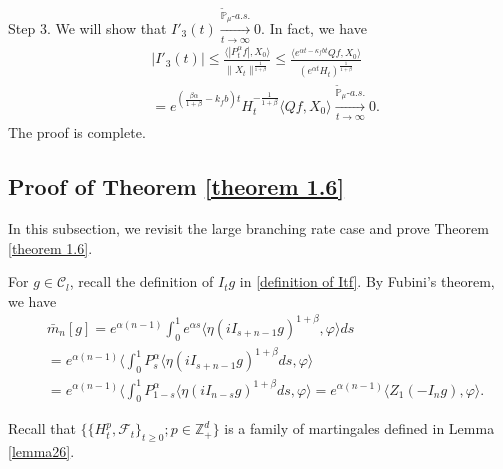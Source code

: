 \documentclass[12pt,a4paper]{amsart}
\theoremstyle{plain}
\theoremstyle{definition}
\numberwithin{equation}{section}
\begin{document}
	Step 3. We will show that $I'_3(t) \xrightarrow[t\to \infty]{\tilde {\mathbb P}_\mu \text{-} a.s.} 0$.
In fact, we have
\begin{equation}\begin{split}
	&|I'_3(t)|
     \leq \frac{\langle |P^\alpha_tf|,X_0\rangle}{\|X_t\|^{\frac{1}{1+\beta}}}
	\leq \frac{\langle e^{\alpha t - \kappa_f b t}Qf,X_0\rangle}{(e^{\alpha t} H_t)^{\frac{1}{1+\beta}}}
	\\& = e^{(\frac{\beta \alpha }{1+\beta} - k_fb)t} H_t^{-\frac{1}{1+\beta}} \langle Qf,X_0\rangle
	\xrightarrow[t\to \infty]{\tilde {\mathbb P}_\mu \text{-} a.s.} 0.
\end{split}\end{equation}
	The proof is complete.
\subsection{Proof of Theorem \ref{theorem 1.6}}\label{large rate again}
In this subsection, 
we revisit the large branching rate case and prove Theorem \ref{theorem 1.6}.

For $g\in \mathcal{C}_l$, recall the definition of $I_tg$ in \eqref{definition of Itf}.
By Fubini's theorem, we have
\begin{align}\label{equ: transform of mn}
    &\bar{m}_n[g]=e^{\alpha(n-1)}\int_0^1 e^{\alpha s}\langle \eta(iI_{s+n-1}g)^{1+\beta}, \varphi\rangle ds\\
    &=e^{\alpha(n-1)}\langle \int_0^1 P_s^{\alpha}\langle \eta(iI_{s+n-1}g)^{1+\beta}ds, \varphi\rangle\\
    &=e^{\alpha(n-1)}\langle \int_0^1 P_{1-s}^{\alpha}\langle \eta(iI_{n-s}g)^{1+\beta}ds, \varphi\rangle=e^{\alpha(n-1)}\langle Z_1(-I_ng), \varphi\rangle.
\end{align}

Recall that $\Big\{\{H^p_t, \mathscr{F}_t\}_{t\geq 0};p\in \mathbb{Z}_+^d\Big\}$ is a family of martingales defined in Lemma \ref{lemma26}.
\end{document}
